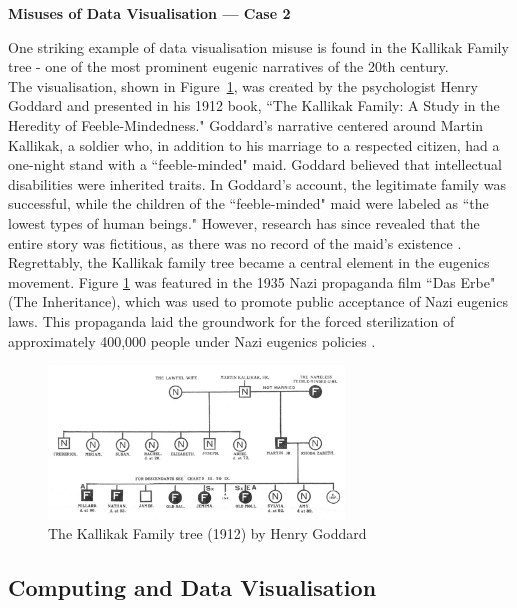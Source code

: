 \documentclass{article}\usepackage[]{graphicx}\usepackage[]{xcolor}
\numberwithin{equation}{section}
\begin{document}
\noindent 
\textbf{Misuses of Data Visualisation — Case 2}

\noindent
One striking example of data visualisation misuse is found in the Kallikak Family tree - one of the most prominent eugenic narratives of the 20th century.\\

\noindent
The visualisation, shown in Figure~\ref{fig:familytree}, was created by the psychologist Henry Goddard and presented in his 1912 book, ``The Kallikak Family: A Study in the Heredity of Feeble-Mindedness." Goddard's narrative centered around Martin Kallikak, a soldier who, in addition to his marriage to a respected citizen, had a one-night stand with a ``feeble-minded" maid. Goddard believed that intellectual disabilities were inherited traits. In Goddard's account, the legitimate family was successful, while the children of the ``feeble-minded" maid were labeled as ``the lowest types of human beings." However, research has since revealed that the entire story was fictitious, as there was no record of the maid's existence \cite{fakedata}.\\

\noindent
Regrettably, the Kallikak family tree became a central element in the eugenics movement. Figure \ref{fig:familytree} was featured in the 1935 Nazi propaganda film ``Das Erbe" (The Inheritance), which was used to promote public acceptance of Nazi eugenics laws. This propaganda laid the groundwork for the forced sterilization of approximately 400,000 people under Nazi eugenics policies \cite{eugenics}.

\begin{figure}[H]
    \centering
    \includegraphics[width=0.7\textwidth]{image_reference/familytree.jpg}
    \caption{The Kallikak Family tree (1912) by Henry Goddard \cite{ktree}}
    \label{fig:familytree}
\end{figure}

\subsection{Computing and Data Visualisation}
\end{document}
